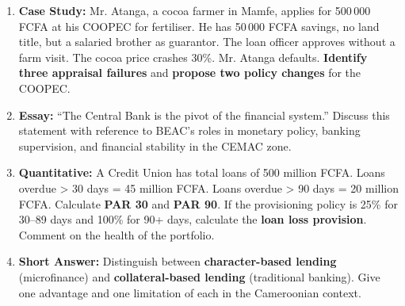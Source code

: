 \documentclass[11pt]{article}
\begin{document}
\begin{exercice}
\begin{enumerate}
    \item \textbf{Case Study:} Mr. Atanga, a cocoa farmer in Mamfe, applies for 500\,000 FCFA at his COOPEC for fertiliser. He has 50\,000 FCFA savings, no land title, but a salaried brother as guarantor. The loan officer approves without a farm visit. The cocoa price crashes 30\%. Mr. Atanga defaults. \textbf{Identify three appraisal failures} and \textbf{propose two policy changes} for the COOPEC.
    \item \textbf{Essay:} ``The Central Bank is the pivot of the financial system.'' Discuss this statement with reference to BEAC's roles in monetary policy, banking supervision, and financial stability in the CEMAC zone.
    \item \textbf{Quantitative:} A Credit Union has total loans of 500 million FCFA. Loans overdue > 30 days = 45 million FCFA. Loans overdue > 90 days = 20 million FCFA. Calculate \textbf{PAR 30} and \textbf{PAR 90}. If the provisioning policy is 25\% for 30--89 days and 100\% for 90+ days, calculate the \textbf{loan loss provision}. Comment on the health of the portfolio.
    \item \textbf{Short Answer:} Distinguish between \textbf{character-based lending} (microfinance) and \textbf{collateral-based lending} (traditional banking). Give one advantage and one limitation of each in the Cameroonian context.
\end{enumerate}
\end{exercice}
\end{document}

